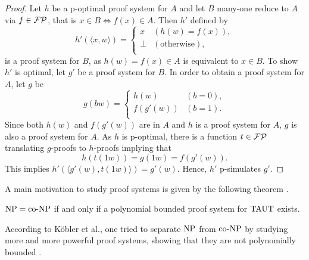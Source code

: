   \begin{proof}
    Let \(h\) be a p-optimal proof system for \(A\) and let \(B\) many-one reduce to \(A\) via \(f \in \mathcal{FP}\), that is \(x \in B \Leftrightarrow f(x) \in A\). Then \(h'\) defined by
      \[ 
        h'(\langle x, w \rangle) =
        \begin{cases}
          x & (h(w) = f(x)), \\
          \perp & (\text{otherwise}), \\
        \end{cases}
      \]
    is a proof system for \(B\), as \(h(w) = f(x) \in A\) is equivalent to \(x \in B\). To show \(h'\) is optimal, let \(g'\) be a proof system for \(B\). In order to obtain a proof system for \(A\), let \(g\) be
      \[
        g(bw) =
        \begin{cases}
          h(w) & (b = 0), \\
          f(g'(w)) & (b = 1). \\
        \end{cases}
      \]
    Since both \(h(w)\) and \(f(g'(w))\) are in \(A\) and \(h\) is a proof system for \(A\), \(g\) is also a proof system for \(A\). As \(h\) is p-optimal, there is a function \(t \in \mathcal{FP}\) translating \(g\)-proofs to \(h\)-proofs implying that
    \[
      h(t(1w)) = g(1w) = f(g'(w)).
    \]
    This implies \(h'(\langle g'(w), t(1w) \rangle ) = g'(w)\). Hence, \(h'\) p-simulates \(g'\).
  \end{proof}

  A main motivation to study proof systems is given by the following theorem \cite{KMT03}.

  \begin{theorem}
   \(\text{NP} = \text{co-NP}\) if and only if a polynomial bounded proof system for \(\text{TAUT}\) exists.
  \end{theorem}

  According to Köbler et al., one tried to separate \(\text{NP}\) from \(\text{co-NP}\) by studying more and more powerful proof systems, showing that they are not polynomially bounded \cite{KMT03}.




  